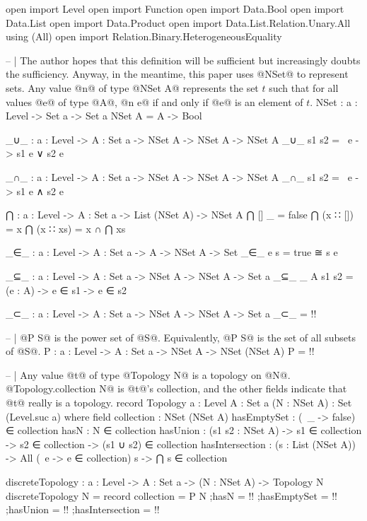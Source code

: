\begin{code}
open import Level
open import Function
open import Data.Bool
open import Data.List
open import Data.Product
open import Data.List.Relation.Unary.All using (All)
open import Relation.Binary.HeterogeneousEquality

-- | The author hopes that this definition will be sufficient but increasingly doubts the sufficiency.  Anyway, in the meantime, this paper uses @NSet@ to represent sets.  Any value @n@ of type @NSet A@ represents the set \(t\) such that for all values @e@ of type @A@, @n e@ if and only if @e@ is an element of \(t\).
NSet : {a : Level} -> Set a -> Set a
NSet A = A -> Bool

_∪_ : {a : Level} -> {A : Set a} -> NSet A -> NSet A -> NSet A
_∪_ s1 s2 = \ e -> s1 e ∨ s2 e

_∩_ : {a : Level} -> {A : Set a} -> NSet A -> NSet A -> NSet A
_∩_ s1 s2 = \ e -> s1 e ∧ s2 e

⋂ : {a : Level} -> {A : Set a} -> List (NSet A) -> NSet A
⋂ [] _ = false
⋂ (x ∷ []) = x
⋂ (x ∷ xs) = x ∩ ⋂ xs

_∈_ : {a : Level} -> {A : Set a} -> A -> NSet A -> Set
_∈_ e s = true ≅ s e

_⊆_ : {a : Level} -> {A : Set a} -> NSet A -> NSet A -> Set a
_⊆_ {_} {A} s1 s2 = (e : A) -> e ∈ s1 -> e ∈ s2

_⊂_ : {a : Level} -> {A : Set a} -> NSet A -> NSet A -> Set a
_⊂_ = {!!}

-- | @P S@ is the power set of @S@.  Equivalently, @P S@ is the set of all subsets of @S@.
P : {a : Level} -> {A : Set a} -> NSet A -> NSet (NSet A)
P = {!!}

-- | Any value @t@ of type @Topology N@ is a topology on @N@.  @Topology.collection N@ is @t@'s collection, and the other fields indicate that @t@ really is a topology.
record Topology {a : Level}
                {A : Set a}
                (N : NSet A) : Set (Level.suc a) where
  field
    collection : NSet (NSet A)
    hasEmptySet : (\ _ -> false) ∈ collection
    hasN : N ∈ collection
    hasUnion : (s1 s2 : NSet A) ->
               s1 ∈ collection ->
               s2 ∈ collection ->
               (s1 ∪ s2) ∈ collection
    hasIntersection : (s : List (NSet A)) ->
                      All (\ e -> e ∈ collection) s ->
                      ⋂ s ∈ collection

discreteTopology : {a : Level} -> {A : Set a} -> (N : NSet A) -> Topology N
discreteTopology N = record
  {collection = P N
  ;hasN = {!!}
  ;hasEmptySet = {!!}
  ;hasUnion = {!!}
  ;hasIntersection = {!!}
  }


\end{code}
